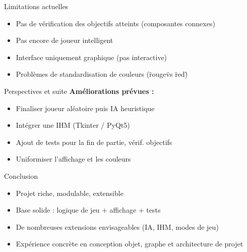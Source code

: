 \documentclass{beamer}
\begin{document}
\begin{frame}{Limitations actuelles}
\begin{itemize}
    \item Pas de v\'erification des objectifs atteints (composantes connexes)
    \item Pas encore de joueur intelligent
    \item Interface uniquement graphique (pas interactive)
    \item Probl\`emes de standardisation de couleurs (\"rouge\" vs \"red\")
\end{itemize}
\end{frame}

\begin{frame}{Perspectives et suite}
\textbf{Am\'eliorations pr\'evues :}
\begin{itemize}
    \item Finaliser joueur al\'eatoire puis IA heuristique
    \item Int\'egrer une IHM (Tkinter / PyQt5)
    \item Ajout de tests pour la fin de partie, v\'erif. objectifs
    \item Uniformiser l'affichage et les couleurs
\end{itemize}
\end{frame}

\begin{frame}{Conclusion}
\begin{itemize}
    \item Projet riche, modulable, extensible
    \item Base solide : logique de jeu + affichage + tests
    \item De nombreuses extensions envisageables (IA, IHM, modes de jeu)
    \item Exp\'erience concr\`ete en conception objet, graphe et architecture de projet
\end{itemize}
\end{frame}
\end{document}

